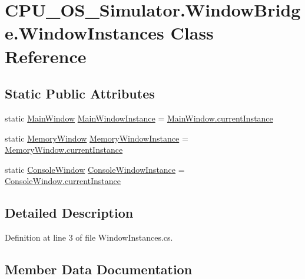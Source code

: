 \hypertarget{class_c_p_u___o_s___simulator_1_1_window_bridge_1_1_window_instances}{}\section{C\+P\+U\+\_\+\+O\+S\+\_\+\+Simulator.\+Window\+Bridge.\+Window\+Instances Class Reference}
\label{class_c_p_u___o_s___simulator_1_1_window_bridge_1_1_window_instances}
\subsection*{Static Public Attributes}
\begin{DoxyCompactItemize}
\item 
static \hyperlink{class_c_p_u___o_s___simulator_1_1_main_window}{Main\+Window} \hyperlink{class_c_p_u___o_s___simulator_1_1_window_bridge_1_1_window_instances_a130a2c32e8ccfd51a42ecb363fbb42cc}{Main\+Window\+Instance} = \hyperlink{class_c_p_u___o_s___simulator_1_1_main_window_a1280266cc57403a91f08a8350dee05cc}{Main\+Window.\+current\+Instance}
\item 
static \hyperlink{class_c_p_u___o_s___simulator_1_1_memory_window}{Memory\+Window} \hyperlink{class_c_p_u___o_s___simulator_1_1_window_bridge_1_1_window_instances_a401fd485bde830472a1a960a25ec1464}{Memory\+Window\+Instance} = \hyperlink{class_c_p_u___o_s___simulator_1_1_memory_window_a870b795e3b919a82888ad608ab24d61a}{Memory\+Window.\+current\+Instance}
\item 
static \hyperlink{class_c_p_u___o_s___simulator_1_1_console_window}{Console\+Window} \hyperlink{class_c_p_u___o_s___simulator_1_1_window_bridge_1_1_window_instances_a90b746b2373f150cab75e4dee0f91c45}{Console\+Window\+Instance} = \hyperlink{class_c_p_u___o_s___simulator_1_1_console_window_abee2fd1e118dd4f81dc2142bc033da4a}{Console\+Window.\+current\+Instance}
\end{DoxyCompactItemize}


\subsection{Detailed Description}


Definition at line 3 of file Window\+Instances.\+cs.



\subsection{Member Data Documentation}
\hypertarget{class_c_p_u___o_s___simulator_1_1_window_bridge_1_1_window_instances_a90b746b2373f150cab75e4dee0f91c45}{}
